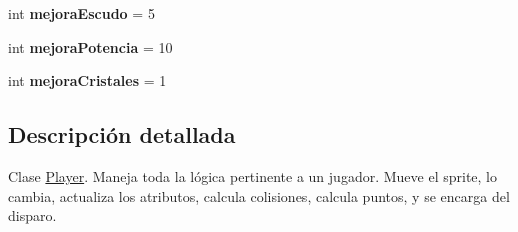 \begin{DoxyCompactItemize}
\item 
\hypertarget{classBatallaEspacial_1_1Player_af58c44be76605c755a6145f2cdb5eb03}{
int {\bfseries mejoraEscudo} = 5}
\label{classBatallaEspacial_1_1Player_af58c44be76605c755a6145f2cdb5eb03}

\item 
\hypertarget{classBatallaEspacial_1_1Player_a27154ef714977760a0ff8a2b4d2d1d3c}{
int {\bfseries mejoraPotencia} = 10}
\label{classBatallaEspacial_1_1Player_a27154ef714977760a0ff8a2b4d2d1d3c}

\item 
\hypertarget{classBatallaEspacial_1_1Player_a72373a209d11472635eb7015149f4c50}{
int {\bfseries mejoraCristales} = 1}
\label{classBatallaEspacial_1_1Player_a72373a209d11472635eb7015149f4c50}

\end{DoxyCompactItemize}


\subsection{Descripción detallada}
Clase \hyperlink{classBatallaEspacial_1_1Player}{Player}. Maneja toda la lógica pertinente a un jugador. Mueve el sprite, lo cambia, actualiza los atributos, calcula colisiones, calcula puntos, y se encarga del disparo. 

